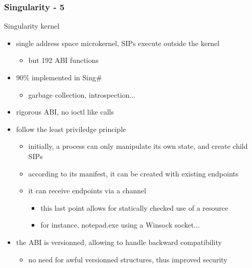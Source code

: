 \begin{frame}
  \frametitle{Singularity - 5}
  Singularity kernel
 
 \begin{itemize}
   \item single address space microkernel, SIPs execute outside the kernel
     \begin{itemize} \item but 192 ABI functions \end{itemize}
   \item 90\% implemented in Sing\#
     \begin{itemize} \item garbage collection, introspection... \end{itemize}
   \item rigorous ABI, no ioctl like calls
   \item follow the least priviledge principle
   \begin{itemize}
     \item initially, a process can only manipulate its own state, and create child SIPs
     \item according to its manifest, it can be created with existing endpoints
     \item it can receive endpoints via a channel
     \begin{itemize}
       \item this last point allows for statically checked use of a resource
       \item for instance, notepad.exe using a Winsock socket...
     \end{itemize}
   \end{itemize}
  \item the ABI is versionned, allowing to handle backward compatibility
    \begin{itemize} \item no need for awful versionned structures, thus improved security \end{itemize}
 \end{itemize}
\end{frame}


